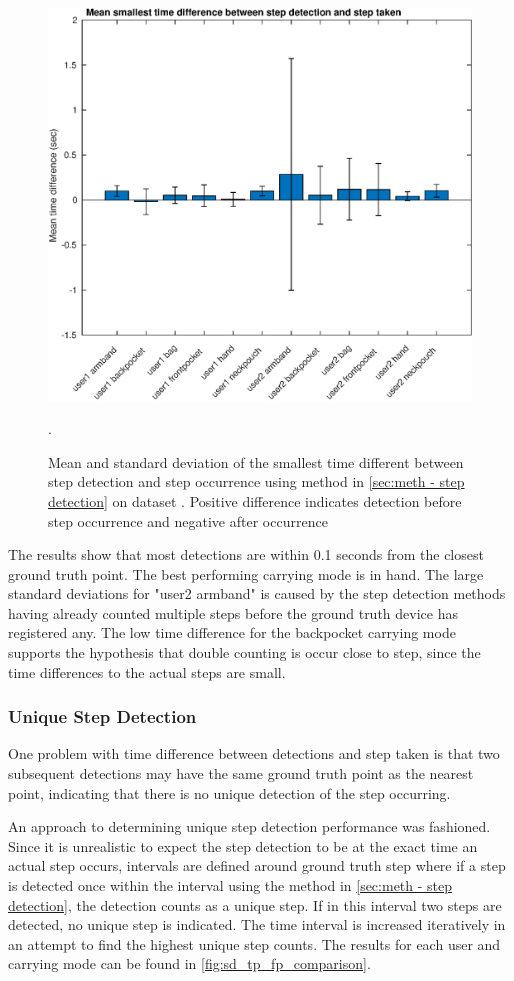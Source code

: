 \begin{figure}[H]
	\centering
	\includegraphics[width=0.7\linewidth]{images/20201127_1607_Mean_smallest_time_difference_between_step_detection_and_step_taken}
	\caption{Mean and standard deviation of the smallest time different between step detection and step occurrence using method in \cref{sec:meth - step detection} on \citet{Brajdic2013} dataset . Positive difference indicates detection before step occurrence and negative after occurrence}
	\label{fig:202011130914smallest_diff_to_gt_1}.
\end{figure}

The results show that most detections are within 0.1 seconds from the closest ground truth point. The best performing carrying mode is in hand. The large standard deviations for "user2 armband" is caused by the step detection methods having already counted multiple steps before the ground truth device has registered any. The low time difference for the backpocket carrying mode supports the hypothesis that double counting is occur close to step, since the time differences to the actual steps are small.

\subsubsection{Unique Step Detection}

One problem with time difference between detections and step taken is that two subsequent detections may have the same ground truth point as the nearest point, indicating that there is no unique detection of the step occurring. \par 

An approach to determining unique step detection performance was fashioned. Since it is unrealistic to expect the step detection to be at the exact time an actual step occurs, intervals are defined around ground truth step where if a step is detected once within the interval using the method in \cref{sec:meth - step detection}, the detection counts as a unique step. If in this interval two steps are detected, no unique step is indicated. The time interval is increased iteratively in an attempt to find the highest unique step counts. The results for each user and carrying mode can be found in \cref{fig:sd_tp_fp_comparison}. 

